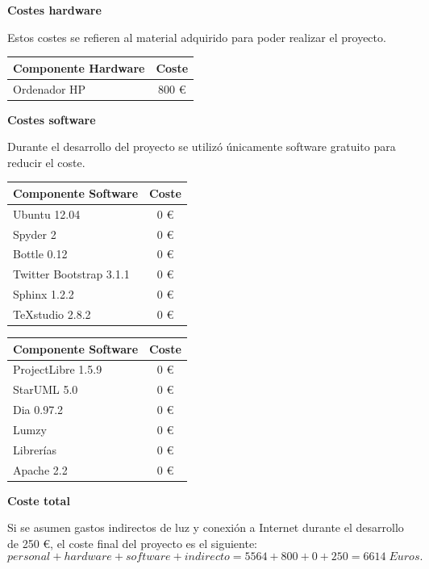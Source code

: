 \noindent
\textbf{Costes hardware}

Estos costes se refieren al material adquirido para poder realizar el proyecto.

\begin{table}[H]
	\centering
	\begin{tabular}{|l|c|}
		\hline
		\textbf{Componente Hardware} & \textbf{Coste} \\ \hline
		Ordenador HP & 800 \euro \\ \hline
	\end{tabular}
\end{table}

\noindent
\textbf{Costes software}

Durante el desarrollo del proyecto se utilizó únicamente software gratuito para reducir el coste.

\begin{table}[H]
	\centering
	\begin{tabular}{|l|c|}
		\hline
		\textbf{Componente Software} & \textbf{Coste} \\ \hline
		Ubuntu 12.04 & 0 \euro \\ \hline
		Spyder 2 & 0 \euro \\ \hline
		Bottle 0.12 & 0 \euro \\ \hline
		Twitter Bootstrap 3.1.1 & 0 \euro \\ \hline
		Sphinx 1.2.2 & 0 \euro \\ \hline
		TeXstudio 2.8.2 & 0 \euro \\ \hline
	\end{tabular}
	\quad
	\begin{tabular}{|l|c|}
		\hline
		\textbf{Componente Software} & \textbf{Coste} \\ \hline
		ProjectLibre 1.5.9 & 0 \euro \\ \hline
		StarUML 5.0 & 0 \euro \\ \hline
		Dia 0.97.2 & 0 \euro \\ \hline
		Lumzy & 0 \euro \\ \hline
		Librerías & 0 \euro \\ \hline
		Apache 2.2 & 0 \euro \\ \hline
	\end{tabular}
\end{table}

\noindent
\textbf{Coste total}

Si se asumen gastos indirectos de luz y conexión a Internet durante el desarrollo de 250 \euro, el coste final  del proyecto es el siguiente:
\[ personal + hardware + software + indirecto = 5564 + 800 + 0 + 250 = 6614 \; Euros. \]